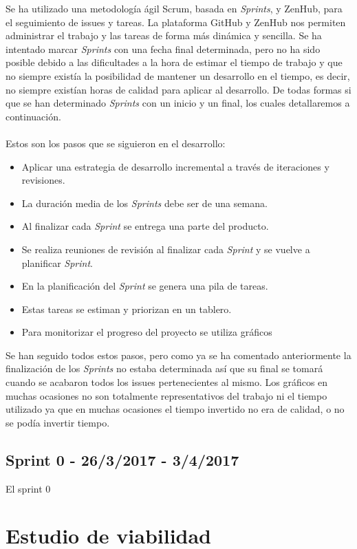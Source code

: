 Se ha utilizado una metodología ágil Scrum, basada en \emph{Sprints}, y ZenHub, para el seguimiento de issues y tareas. La plataforma GitHub y ZenHub nos permiten administrar el trabajo y las tareas de forma más dinámica y sencilla. Se ha intentado marcar \emph{Sprints} con una fecha final determinada, pero no ha sido posible debido a las dificultades a la hora de estimar el tiempo de trabajo y que no siempre existía la posibilidad de mantener un desarrollo en el tiempo, es decir, no siempre existían horas de calidad para aplicar al desarrollo.
De todas formas si que se han determinado \emph{Sprints} con un inicio y un final, los cuales detallaremos a continuación.
\\
\\
Estos son los pasos que se siguieron en el desarrollo: 

\begin{itemize}
\item
  Aplicar una estrategia de desarrollo incremental a través de
  iteraciones y revisiones.
\item
  La duración media de los \emph{Sprints} debe ser de una semana.
\item
  Al finalizar cada \emph{Sprint} se entrega una parte del producto.
\item
  Se realiza reuniones de revisión al finalizar cada \emph{Sprint} y se vuelve a planificar \emph{Sprint}.
\item
  En la planificación del \emph{Sprint} se genera una pila de tareas.
\item
  Estas tareas se estiman y priorizan en un tablero.
\item
  Para monitorizar el progreso del proyecto se utiliza gráficos
\end{itemize}

Se han seguido todos estos pasos, pero como ya se ha comentado anteriormente la finalización de los \emph{Sprints} no estaba determinada así que su final se tomará cuando se acabaron todos los issues pertenecientes al mismo. Los gráficos en muchas ocasiones no son totalmente representativos del trabajo ni el tiempo utilizado ya que en muchas ocasiones el tiempo invertido no era de calidad, o no se podía invertir tiempo.

\subsection{Sprint 0 - 26/3/2017 - 3/4/2017 }\label{splrint0}
El sprint 0

 
\section{Estudio de viabilidad}

